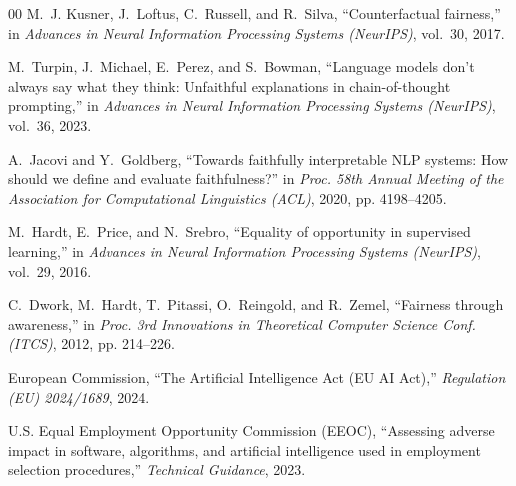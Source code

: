 \documentclass[conference]{IEEEtran}
\begin{document}
\begin{thebibliography}{00}
M.~J. Kusner, J.~Loftus, C.~Russell, and R.~Silva, ``Counterfactual fairness,'' in \emph{Advances in Neural Information Processing Systems (NeurIPS)}, vol.~30, 2017.

M.~Turpin, J.~Michael, E.~Perez, and S.~Bowman, ``Language models don't always say what they think: Unfaithful explanations in chain-of-thought prompting,'' in \emph{Advances in Neural Information Processing Systems (NeurIPS)}, vol.~36, 2023.

A.~Jacovi and Y.~Goldberg, ``Towards faithfully interpretable NLP systems: How should we define and evaluate faithfulness?'' in \emph{Proc. 58th Annual Meeting of the Association for Computational Linguistics (ACL)}, 2020, pp. 4198--4205.

M.~Hardt, E.~Price, and N.~Srebro, ``Equality of opportunity in supervised learning,'' in \emph{Advances in Neural Information Processing Systems (NeurIPS)}, vol.~29, 2016.

C.~Dwork, M.~Hardt, T.~Pitassi, O.~Reingold, and R.~Zemel, ``Fairness through awareness,'' in \emph{Proc. 3rd Innovations in Theoretical Computer Science Conf. (ITCS)}, 2012, pp. 214--226.

European Commission, ``The Artificial Intelligence Act (EU AI Act),'' \emph{Regulation (EU) 2024/1689}, 2024.

U.S. Equal Employment Opportunity Commission (EEOC), ``Assessing adverse impact in software, algorithms, and artificial intelligence used in employment selection procedures,'' \emph{Technical Guidance}, 2023.
\end{thebibliography}
\end{document}
